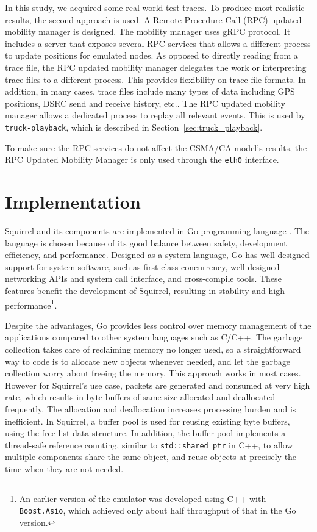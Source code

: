 \documentclass[12pt]{report}
\begin{document}
In this study, we acquired some real-world test traces. To produce most realistic results, the second approach is used. A Remote Procedure Call (RPC) updated mobility manager is designed. The mobility manager uses gRPC \cite{grpc} protocol. It includes a server that exposes several RPC services that allows a different process to update positions for emulated nodes. As opposed to directly reading from a trace file, the RPC updated mobility manager delegates the work or interpreting trace files to a different process. This provides flexibility on trace file formats. In addition, in many cases, trace files include many types of data including GPS positions, DSRC send and receive history, etc.. The RPC updated mobility manager allows a dedicated process to replay all relevant events. This is used by \texttt{truck-playback}, which is described in Section~\ref{sec:truck_playback}.

To make sure the RPC services do not affect the CSMA/CA model's results, the RPC Updated Mobility Manager is only used through the \texttt{eth0} interface.

\section{Implementation}
\label{sec:squirrel_implementation}

Squirrel and its components are implemented in Go programming language \cite{golang}. The language is chosen because of its good balance between safety, development efficiency, and performance. Designed as a system language, Go has well designed support for system software, such as first-class concurrency, well-designed networking APIs and system call interface, and cross-compile tools. These features benefit the development of Squirrel, resulting in stability and high performance\footnote{An earlier version of the emulator was developed using C++ with \texttt{Boost.Asio}, which achieved only about half throughput of that in the Go version.}.

Despite the advantages, Go provides less control over memory management of the applications compared to other system languages such as C/C++. The garbage collection takes care of reclaiming memory no longer used, so a straightforward way to code is to allocate new objects whenever needed, and let the garbage collection worry about freeing the memory. This approach works in most cases. However for Squirrel's use case, packets are generated and consumed at very high rate, which results in byte buffers of same size allocated and deallocated frequently. The allocation and deallocation increases processing burden and is inefficient. In Squirrel, a buffer pool is used for reusing existing byte buffers, using the free-list data structure. In addition, the buffer pool implements a thread-safe reference counting, similar to \texttt{std::shared\_ptr} in C++, to allow multiple components share the same object, and reuse objects at precisely the time when they are not needed.
\end{document}

